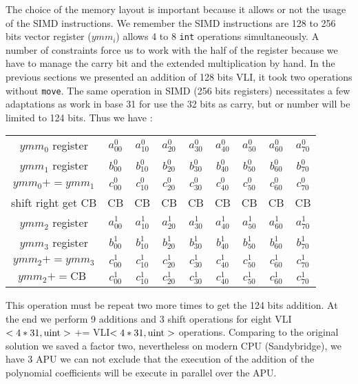 \documentclass[11pt]{amsart}
\begin{document}
The choice of the memory layout is important because it allows or not the usage of the SIMD instructions. We remember  the SIMD instructions are 128 to 256 bits vector register ($ymm_i$) allows 4 to 8 \texttt{int}  operations simultaneously.
A number of constraints force us to work with the half of the register because we have to manage the carry bit and the extended multiplication by hand. In the previous sections we presented an addition of 128 bits VLI, it took two operations
without \texttt{move}.   The same operation in SIMD (256 bits registers) necessitates a few adaptations as work in base 31 for use the 32 bits as carry, but or number will be limited to 124 bits. Thus  we have :    


\begin{center}
\begin{tabular}{ c  c c c c c c c c} 
 $ymm_0$   register      &    $a^0_{00}$  & $a^0_{10}$ & $a^0_{20}$  &  $a^0_{30}$ & $a^0_{40}$  &   $a^0_{50}$ &  $a^0_{60}$   & $a^0_{70}$  \\
 $ymm_1$   register      &    $b^0_{00}$  & $b^0_{10}$ & $b^0_{20}$  &  $b^0_{30}$ & $b^0_{40}$  &   $b^0_{50}$ &  $b^0_{60}$   & $b^0_{70}$  \\
$ymm_0 += ymm_1$    &    $c^0_{00}$  & $c^0_{10}$ & $c^0_{20}$  &  $c^0_{30}$  & $c^0_{40}$  &   $c^0_{50}$  &  $c^0_{60}$   & $c^0_{70}$  \\
shift right  get CB        &     CB                 & CB                & CB                 & CB                   & CB               &  CB                   & CB                   & CB \\
$ymm_2$   register      &    $a^1_{00}$  & $a^1_{10}$ & $a^1_{20}$  &  $a^1_{30}$ & $a^1_{40}$  &   $a^1_{50}$ &  $a^1_{60}$   & $a^1_{70}$  \\
 $ymm_3$   register      &    $b^1_{00}$  & $b^1_{10}$ & $b^1_{20}$  &  $b^1_{30}$ & $b^1_{40}$  &   $b^1_{50}$ &  $b^1_{60}$   & $b^1_{70}$  \\
$ymm_2 += ymm_3$     & $c^1_{00}$  & $c^1_{10}$ & $c^1_{20}$  &  $c^1_{30}$  & $c^1_{40}$  &   $c^1_{50}$  &  $c^1_{60}$   & $c^1_{70}$  \\                            
$ymm_2 +=  \textrm{CB } $ & $c^1_{00}$  & $c^1_{10}$ & $c^1_{20}$  &  $c^1_{30}$  & $c^1_{40}$  &   $c^1_{50}$  &  $c^1_{60}$   & $c^1_{70}$  \\                            
\end{tabular}
\end{center}

This operation must be repeat two more times to get the 124 bits addition. At the end we perform 9 additions and 3  shift operations for eight VLI$<4*31, \texttt{\textrm{uint}}>$ += VLI$<4*31, \texttt{\textrm{uint}}>$ operations. 
 Comparing to the original solution we saved a factor two,  nevertheless on modern CPU (Sandybridge), we have 3 APU  we can not exclude that the execution of  the addition of the polynomial coefficients will be execute in parallel over the APU. 
\end{document}
